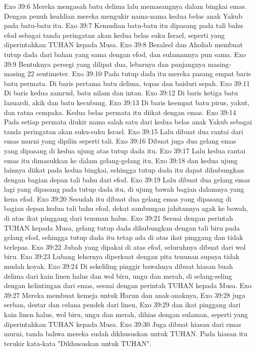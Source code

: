Exo 39:6  Mereka mengasah batu delima lalu memasangnya dalam bingkai emas. Dengan penuh keahlian mereka mengukir nama-nama kedua belas anak Yakub pada batu-batu itu.
Exo 39:7  Kemudian batu-batu itu dipasang pada tali bahu efod sebagai tanda peringatan akan kedua belas suku Israel, seperti yang diperintahkan TUHAN kepada Musa.
Exo 39:8  Bezaleel dan Aholiab membuat tutup dada dari bahan yang sama dengan efod, dan sulamannya pun sama.
Exo 39:9  Bentuknya persegi yang dilipat dua, lebarnya dan panjangnya masing-masing 22 sentimeter.
Exo 39:10  Pada tutup dada itu mereka pasang empat baris batu permata. Di baris pertama batu delima, topas dan baiduri sepah.
Exo 39:11  Di baris kedua zamrud, batu nilam dan intan.
Exo 39:12  Di baris ketiga batu lazuardi, akik dan batu kecubung.
Exo 39:13  Di baris keempat batu pirus, yakut, dan ratna cempaka. Kedua belas permata itu diikat dengan emas.
Exo 39:14  Pada setiap permata diukir nama salah satu dari kedua belas anak Yakub sebagai tanda peringatan akan suku-suku Israel.
Exo 39:15  Lalu dibuat dua rantai dari emas murni yang dipilin seperti tali.
Exo 39:16  Dibuat juga dua gelang emas yang dipasang di kedua ujung atas tutup dada itu.
Exo 39:17  Lalu kedua rantai emas itu dimasukkan ke dalam gelang-gelang itu,
Exo 39:18  dan kedua ujung lainnya diikat pada kedua bingkai, sehingga tutup dada itu dapat dihubungkan dengan bagian depan tali bahu dari efod.
Exo 39:19  Lalu dibuat dua gelang emas lagi yang dipasang pada tutup dada itu, di ujung bawah bagian dalamnya yang kena efod.
Exo 39:20  Sesudah itu dibuat dua gelang emas yang dipasang di bagian depan kedua tali bahu efod, dekat sambungan jahitannya agak ke bawah, di atas ikat pinggang dari tenunan halus.
Exo 39:21  Sesuai dengan perintah TUHAN kepada Musa, gelang tutup dada dihubungkan dengan tali biru pada gelang efod, sehingga tutup dada itu tetap ada di atas ikat pinggang dan tidak terlepas.
Exo 39:22  Jubah yang dipakai di atas efod, seluruhnya dibuat dari wol biru.
Exo 39:23  Lubang lehernya diperkuat dengan pita tenunan supaya tidak mudah koyak.
Exo 39:24  Di sekeliling pinggir bawahnya dibuat hiasan buah delima dari kain linen halus dan wol biru, ungu dan merah, di selang-seling dengan kelintingan dari emas, sesuai dengan perintah TUHAN kepada Musa.
Exo 39:27  Mereka membuat kemeja untuk Harun dan anak-anaknya,
Exo 39:28  juga serban, destar dan celana pendek dari linen,
Exo 39:29  dan ikat pinggang dari kain linen halus, wol biru, ungu dan merah, dihias dengan sulaman, seperti yang diperintahkan TUHAN kepada Musa.
Exo 39:30  Juga dibuat hiasan dari emas murni, tanda bahwa mereka sudah dikhususkan untuk TUHAN. Pada hiasan itu terukir kata-kata "Dikhususkan untuk TUHAN".

